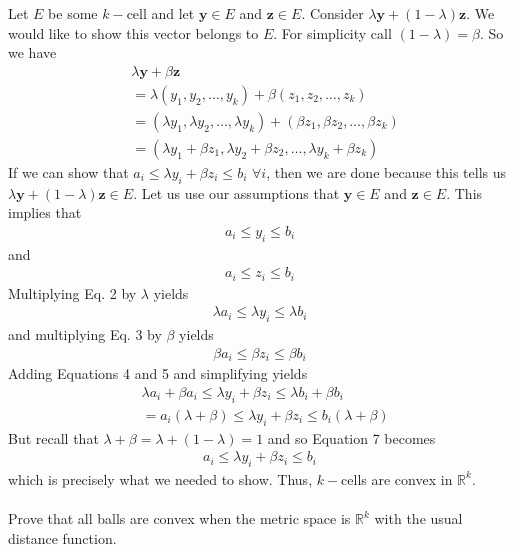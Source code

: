 \documentclass[12pt]{article}
\begin{document}
Let $E$ be some $k-$cell and let $\textbf{y} \in E$ and $\textbf{z} \in E$. Consider $\lambda \textbf{y} + (1-\lambda) \textbf{z}$. We would like to show this vector belongs to $E$. For  simplicity call $(1-\lambda) = \beta$. So we have
\begin{align*}
& \lambda \textbf{y} + \beta \textbf{z} \\
& = \lambda (y_{1}, y_{2}, \ldots, y_{k})+ \beta (z_{1}, z_{2}, \ldots, z_{k}) \\
& = (\lambda y_{1}, \lambda y_{2}, \ldots, \lambda y_{k})+ (\beta z_{1}, \beta z_{2}, \ldots, \beta z_{k}) \\ 
& = (\lambda y_{1}+\beta z_{1} ,\lambda y_{2}+\beta z_{2} , \ldots, \lambda y_{k}+\beta z_{k} )
\end{align*}
If we can show that $a_{i} \leq \lambda y_{i}+\beta z_{i} \leq b_{i}$ $\forall i$, then we are done because  this tells us $\lambda \textbf{y} + (1-\lambda) \textbf{z} \in E$. Let us use our assumptions that $\textbf{y} \in E$ and $\textbf{z} \in E$. This implies that
\begin{align}
a_{i} \leq y_{i} \leq b_{i}
\end{align} and 
\begin{align}
a_{i} \leq z_{i} \leq b_{i}
\end{align}
Multiplying Eq. 2 by $\lambda$ yields
\begin{align}
\lambda a_{i} \leq \lambda y_{i} \leq \lambda  b_{i}
\end{align} and multiplying Eq. 3 by $\beta$ yields
\begin{align}
\beta a_{i} \leq \beta z_{i} \leq \beta b_{i}
\end{align}
Adding Equations 4 and 5 and simplifying yields
\begin{align}
& \lambda a_{i} + \beta a_{i} \leq \lambda y_{i} + \beta z_{i} \leq \lambda  b_{i} + \beta b_{i} \\ 
& = a_{i}(\lambda + \beta) \leq \lambda y_{i} + \beta z_{i}  \leq  b_{i}(\lambda + \beta)
\end{align}
But recall that $\lambda + \beta = \lambda + (1 - \lambda) = 1$ and so Equation 7 becomes
\begin{align}
a_{i} \leq \lambda y_{i}+\beta z_{i} \leq b_{i}
\end{align}
which is precisely what we needed to show.  Thus, $k-$cells are convex in $\mathbb{R}^{k}$. \\ \\

\problem Prove that all balls are convex when the metric space is $\mathbb{R}^{k}$ with the usual distance function. \\
\end{document}
